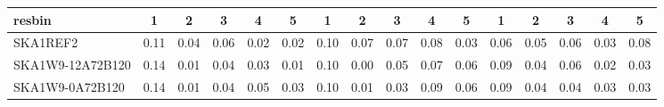 \begin{table}[!htp]
{{\begin{tabular}{|lccccc||ccccc||ccccc|}
 resbin  &1 & 2 & 3 & 4 & 5 & 1 & 2 & 3 & 4 & 5 & 1 & 2 & 3 & 4 & 5 \\ \hline
SKA1REF2 & 0.11 \cellcolor{blue!18.00} & 0.04 \cellcolor{red!60.00} & 0.06 \cellcolor{green!60.00} & 0.02 \cellcolor{orange!18.00} & 0.02 \cellcolor{purple!39.00} & 0.10 \cellcolor{blue!18.00} & 0.07 \cellcolor{red!60.00} & 0.07 \cellcolor{green!60.00} & 0.08 \cellcolor{orange!39.00} & 0.03 \cellcolor{purple!18.00} & 0.06 \cellcolor{blue!18.00} & 0.05 \cellcolor{red!60.00} & 0.06 \cellcolor{green!60.00} & 0.03 \cellcolor{orange!60.00} & 0.08 \cellcolor{purple!60.00}\\ \hline 
SKA1W9-12A72B120 & 0.14 \cellcolor{blue!60.00} & 0.01 \cellcolor{red!18.00} & 0.04 \cellcolor{green!18.00} & 0.03 \cellcolor{orange!32.00} & 0.01 \cellcolor{purple!18.00} & 0.10 \cellcolor{blue!18.00} & 0.00 \cellcolor{red!18.00} & 0.05 \cellcolor{green!39.00} & 0.07 \cellcolor{orange!18.00} & 0.06 \cellcolor{purple!60.00} & 0.09 \cellcolor{blue!60.00} & 0.04 \cellcolor{red!18.00} & 0.06 \cellcolor{green!60.00} & 0.02 \cellcolor{orange!18.00} & 0.03 \cellcolor{purple!18.00}\\ \hline 
SKA1W9-0A72B120 & 0.14 \cellcolor{blue!60.00} & 0.01 \cellcolor{red!18.00} & 0.04 \cellcolor{green!18.00} & 0.05 \cellcolor{orange!60.00} & 0.03 \cellcolor{purple!60.00} & 0.10 \cellcolor{blue!18.00} & 0.01 \cellcolor{red!24.00} & 0.03 \cellcolor{green!18.00} & 0.09 \cellcolor{orange!60.00} & 0.06 \cellcolor{purple!60.00} & 0.09 \cellcolor{blue!60.00} & 0.04 \cellcolor{red!18.00} & 0.04 \cellcolor{green!18.00} & 0.03 \cellcolor{orange!60.00} & 0.03 \cellcolor{purple!18.00}\\ \hline 
\end{tabular}}
\hspace{1cm} 
}
\end{table}
